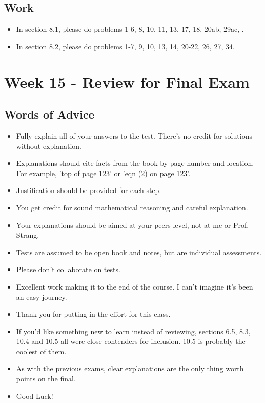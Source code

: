 	\subsection{Work}
		\begin{itemize}
			\item In section 8.1, please do problems 1-6, 8, 10, 11, 13, 17, 18, 20ab, 29ac, .
			\item In section 8.2, please do problems 1-7, 9, 10, 13, 14, 20-22, 26, 27, 34.
		\end{itemize}

	\clearpage



	\section{Week 15 - Review for Final Exam}

	\subsection{Words of Advice}
		\begin{itemize}
			\item Fully explain all of your answers to the test. There's no credit for solutions without explanation.
			\item Explanations should cite facts from the book by page number and location. For example, 'top of page 123' or 'eqn (2) on page 123'.
			\item Justification should be provided for each step.
			\item You get credit for sound mathematical reasoning and careful explanation.
			\item Your explanations should be aimed at your peers level, not at me or Prof. Strang.
			\item Tests are assumed to be open book and notes, but are individual assessments.
			\item Please don't collaborate on tests.
			\item Excellent work making it to the end of the course. I can't imagine it's been an easy journey.
			\item Thank you for putting in the effort for this class.
			\item If you'd like something new to learn instead of reviewing, sections 6.5, 8.3, 10.4 and 10.5 all were close contenders for inclusion. 10.5 is probably the coolest of them.
			\item As with the previous exams, clear explanations are the only thing worth points on the final.
			\item Good Luck!
		\end{itemize}

	\clearpage



